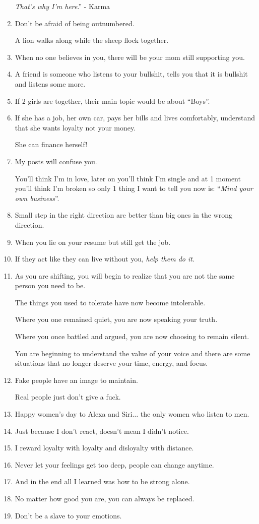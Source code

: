 \documentclass{article}
\begin{document}
\begin{enumerate}
	\textit{That's why I'm here}.'' - Karma
	\item Don't be afraid of being outnumbered.
	
	A lion walks along while the sheep flock together.
	\item When no one believes in you, there will be your mom still supporting you.
	\item A friend is someone who listens to your bullshit, tells you that it is bullshit and listens some more.
	\item If 2 girls are together, their main topic would be about ``Boys''.
	\item If she has a job, her own car, pays her bills and lives comfortably, understand that she wants loyalty not your money.
	
	She can finance herself!
	\item My posts will confuse you.
	
	You'll think I'm in love, later on you'll think I'm single and at 1 moment you'll think I'm broken so only 1 thing I want to tell you now is: ``\textit{Mind your own business}''.
	\item Small step in the right direction are better than big ones in the wrong direction.
	\item When you lie on your resume but still get the job.
	\item If they act like they can live without you, \textit{help them do it}.
	\item As you are shifting, you will begin to realize that you are not the same person you need to be.
	
	The things you used to tolerate have now become intolerable.
	
	Where you one remained quiet, you are now speaking your truth.
	
	Where you once battled and argued, you are now choosing to remain silent.
	
	You are beginning to understand the value of your voice and there are some situations that no longer deserve your time, energy, and focus.
	\item Fake people have an image to maintain.
	
	Real people just don't give a fuck.
	\item Happy women's day to Alexa and Siri$\ldots$ the only women who listen to men.
	\item Just because I don't react, doesn't mean I didn't notice.
	\item I reward loyalty with loyalty and disloyalty with distance.
	\item Never let your feelings get too deep, people can change anytime.
	\item And in the end all I learned was how to be strong alone.
	\item No matter how good you are, you can always be replaced.
	\item Don't be a slave to your emotions.
	

\end{enumerate}
\end{document}
